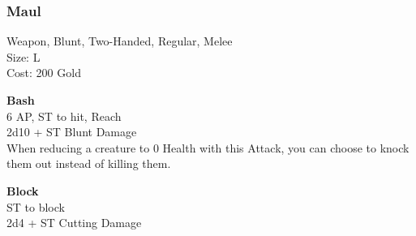 \subsubsection{Maul}\label{weapon:maul}
Weapon, Blunt, Two-Handed, Regular, Melee\\
Size: L\\
Cost: 200 Gold

\textbf{Bash}\\
6 AP, ST to hit,  Reach\\
2d10 + ST Blunt Damage\\
When reducing a creature to 0 Health with this Attack, you can choose to knock them out instead of killing them.

\textbf{Block}\\
ST to block\\
2d4 + \texttimes ST Cutting Damage